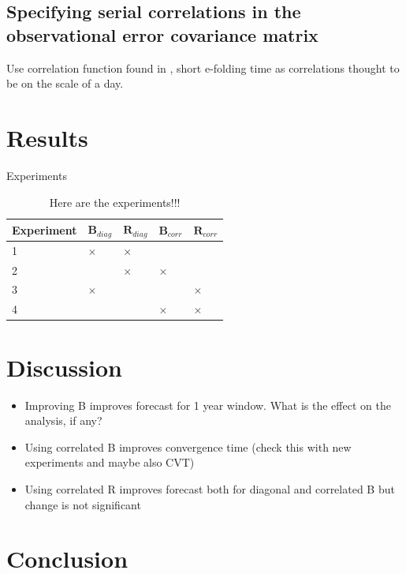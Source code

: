 \documentclass[11pt]{article}
\begin{document}
\subsection{Specifying serial correlations in the observational error covariance matrix}

Use correlation function found in \citep{jarvinen1999variational}, short e-folding time as correlations thought to be on the scale of a day.

\section{Results}

Experiments
\begin{table}
\begin{center}
	\begin{tabular}{| l | l | l | l | l |}
	\hline
	Experiment & $\textbf{B}_{diag}$ & $\textbf{R}_{diag}$ & $\textbf{B}_{corr}$ &
	$\textbf{R}_{corr}$ \\ \hline
	1 & $\times$ & $\times$ & & \\ \hline
	2 & & $\times$ & $\times$ & \\ \hline
	3 & $\times$ & & & $\times$ \\ \hline
	4 & & & $\times$ & $\times$ \\ 
	\hline
	\end{tabular}
	\caption{Here are the experiments!!!}
\end{center}
\end{table}

\section{Discussion}

\begin{itemize}
\item Improving B improves forecast for 1 year window. What is the effect on the analysis, if any?
\item Using correlated B improves convergence time (check this with new experiments and maybe also CVT)
\item Using correlated R improves forecast both for diagonal and correlated B but change is not significant 
\end{itemize} 

\section{Conclusion}
\end{document}
